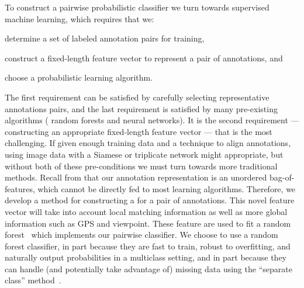 \MatchStateExample{}

To construct a pairwise probabilistic classifier we turn towards supervised
  machine learning, which requires that we:
\begin{enumin}

    \item determine a set of labeled annotation pairs for training, 

    \item construct a fixed-length feature vector to represent a pair of
        annotations,  and 

    \item choose a probabilistic learning algorithm.
\end{enumin}
The first requirement can be satisfied by carefully selecting representative
  annotations pairs, and the last requirement is satisfied by many pre-existing
  algorithms (\eg{} random forests and neural networks).
It is the second requirement --- constructing an appropriate fixed-length
  feature vector --- that is the most challenging.
If given enough training data and a technique to align annotations, using
  image data with a Siamese or triplicate network might appropriate, but without
  both of these pre-conditions we must turn towards more traditional methods.
Recall from  that our annotation representation is an
  unordered bag-of-features, which cannot be directly fed to most learning
  algorithms.
Therefore, we develop a method for constructing a  for a pair of annotations.
This novel feature vector will take into account local matching information as
  well as more global information such as GPS and viewpoint.
These feature are used to fit a random forest~\cite{breiman_random_2001} which
  implements our pairwise classifier.
We choose to use a random forest classifier, in part because they are fast to
  train, robust to overfitting, and naturally output probabilities in a
  multiclass setting, and in part because they can handle (and potentially take
  advantage of) missing data using the ``separate class''
  method~\cite{ding_investigation_2010}.
  

